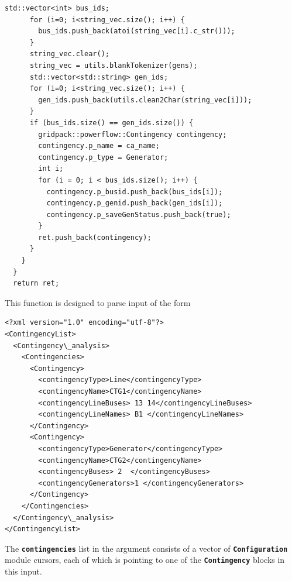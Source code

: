 \documentclass[12pt]{report} %
\begin{document}
{\begin{Verbatim}[fontseries=b]
      std::vector<int> bus_ids;
      for (i=0; i<string_vec.size(); i++) {
        bus_ids.push_back(atoi(string_vec[i].c_str()));
      }
      string_vec.clear();
      string_vec = utils.blankTokenizer(gens);
      std::vector<std::string> gen_ids;
      for (i=0; i<string_vec.size(); i++) {
        gen_ids.push_back(utils.clean2Char(string_vec[i]));
      }
      if (bus_ids.size() == gen_ids.size()) {
        gridpack::powerflow::Contingency contingency;
        contingency.p_name = ca_name;
        contingency.p_type = Generator;
        int i;
        for (i = 0; i < bus_ids.size(); i++) {
          contingency.p_busid.push_back(bus_ids[i]);
          contingency.p_genid.push_back(gen_ids[i]);
          contingency.p_saveGenStatus.push_back(true);
        }
        ret.push_back(contingency);
      }
    }
  }
  return ret;
\end{Verbatim}
}

This function is designed to parse input of the form

{
\color{blue}
\begin{Verbatim}[fontseries=b]
<?xml version="1.0" encoding="utf-8"?>
<ContingencyList>
  <Contingency\_analysis>
    <Contingencies>
      <Contingency>
        <contingencyType>Line</contingencyType>
        <contingencyName>CTG1</contingencyName>
        <contingencyLineBuses> 13 14</contingencyLineBuses>
        <contingencyLineNames> B1 </contingencyLineNames>
      </Contingency>
      <Contingency>
        <contingencyType>Generator</contingencyType>
        <contingencyName>CTG2</contingencyName>
        <contingencyBuses> 2  </contingencyBuses>
        <contingencyGenerators>1 </contingencyGenerators>
      </Contingency>
    </Contingencies>
  </Contingency\_analysis>
</ContingencyList>
\end{Verbatim}
}

The \texttt{\textbf{contingencies}} list in the argument consists of a vector of \texttt{\textbf{Configuration}} module cursors, each of which is pointing to one of the \texttt{\textbf{Contingency}} blocks in this input.
\end{document}
